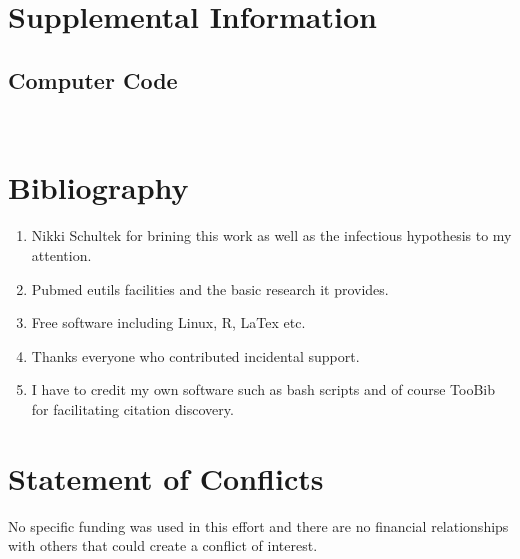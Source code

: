 \documentclass[aps,secnumarabic,balancelastpage,amsmath,amssymb,nofootinbib]{revtex4}
\newcommand{\mjmbasename}{\jobname}
\newcommand{\mjmaddbio}{releases,dailysnapx}
\begin{document}
\section{Supplemental Information}

\subsection{Computer Code}


\begin{lstlisting}


\end{lstlisting}
\section{Bibliography}






\begin{acknowledgments} 

% 
\begin{enumerate}
\item Nikki Schultek for brining this work \cite{Schultek_Nikki_Schultek_LinkedIn_2023} as well as the infectious hypothesis to my attention. 
\item Pubmed eutils facilities and the basic research it provides. 
\item Free software including Linux, R, LaTex  etc.
\item Thanks everyone who contributed incidental support. 
\item I have to credit my own software such as bash scripts
 and of course TooBib\cite{mmarchywka-MJM-2021-002-v0.1.1-rg} for facilitating citation discovery. 
\end{enumerate}

\end{acknowledgments}

\clearpage
\appendix


\section{ Statement of Conflicts }
 No specific funding was used in this effort and there are no financial
relationships with others that could create a conflict of interest. 
\end{document}
